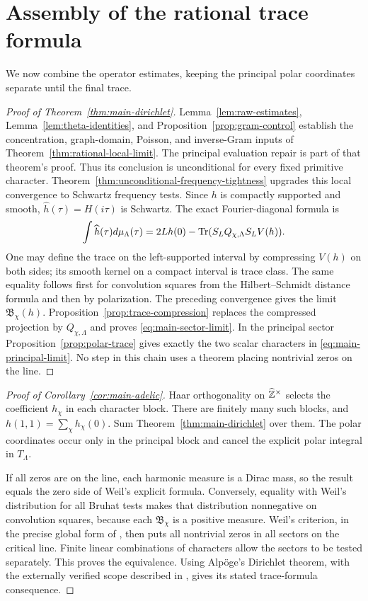 \section{Assembly of the rational trace formula}
\label{sec:rational-assembly}
We now combine the operator estimates, keeping the principal polar
coordinates separate until the final trace.

\begin{proof}[Proof of Theorem~\ref{thm:main-dirichlet}]
Lemma~\ref{lem:raw-estimates}, Lemma~\ref{lem:theta-identities},
and Proposition~\ref{prop:gram-control} establish the concentration,
graph-domain, Poisson, and inverse-Gram inputs of
Theorem~\ref{thm:rational-local-limit}. The principal evaluation
repair is part of that theorem's proof. Thus its conclusion is
unconditional for every fixed primitive character.
Theorem~\ref{thm:unconditional-frequency-tightness} upgrades this
local convergence to Schwartz frequency tests. Since $h$ is
compactly supported and smooth, $\widehat h(\tau)=H(i\tau)$ is
Schwartz. The exact Fourier-diagonal formula is
\[
 \int\widehat h(\tau)d\mu_\Lambda(\tau)
   =2Lh(0)-\operatorname{Tr}(S_LQ_{\chi,\Lambda}S_LV(h)).
\]
One may define the trace on the left-supported interval by
compressing $V(h)$ on both sides; its smooth kernel on a compact
interval is trace class. The same equality follows first for
convolution squares from the Hilbert--Schmidt distance formula
and then by polarization. The preceding convergence gives the
limit $\mathfrak B_\chi(h)$.
Proposition~\ref{prop:trace-compression} replaces the compressed
projection by $Q_{\chi,\Lambda}$ and proves
\eqref{eq:main-sector-limit}. In the principal sector
Proposition~\ref{prop:polar-trace} gives exactly the two scalar
characters in \eqref{eq:main-principal-limit}. No step in this
chain uses a theorem placing nontrivial zeros on the line.
\end{proof}

\begin{proof}[Proof of Corollary~\ref{cor:main-adelic}]
Haar orthogonality on $\widehat{\mathbb Z}^\times$ selects the coefficient
$h_\chi$ in each character block. There are finitely many such
blocks, and $h(1,1)=\sum_\chi h_\chi(0)$. Sum
Theorem~\ref{thm:main-dirichlet} over them. The polar coordinates
occur only in the principal block and cancel the explicit polar
integral in $T_\Lambda$.

If all zeros are on the line, each harmonic measure is a Dirac
mass, so the result equals the zero side of Weil's explicit
formula. Conversely, equality with Weil's distribution for all
Bruhat tests makes that distribution nonnegative on convolution
squares, because each $\mathfrak B_\chi$ is a positive measure.
Weil's criterion, in the precise global form of
\citet[Proposition~6.2 and Corollary~6.3]{ccm2007}, then puts all
nontrivial zeros in all sectors on the critical line. Finite
linear combinations of characters allow the sectors to be
tested separately. This proves the equivalence.
Using Alp\"oge's Dirichlet theorem, with the externally verified
scope described in \citet{mitverification}, gives its stated
trace-formula consequence.
\end{proof}

